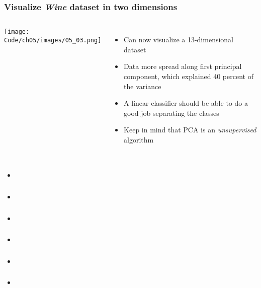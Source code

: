 \documentclass{beamer}
\begin{document}
\begin{frame}
  \frametitle{Visualize \textit{Wine} dataset in two dimensions}
  \begin{columns}[c]
    \texttt{[image: Code/ch05/images/05\_03.png]}
    \begin{itemize}
    \item Can now visualize a 13-dimensional dataset
    \item Data more spread along first principal component, which explained 40 percent of the variance
    \item A linear classifier should be able to do a good job separating the classes
    \item Keep in mind that PCA is an \textit{unsupervised} algorithm
    \end{itemize}
  \end{columns}
\end{frame}

\begin{frame}
  \frametitle{}
  \begin{itemize}
  \item 
  \end{itemize}
\end{frame}

\begin{frame}
  \frametitle{}
  \begin{itemize}
  \item 
  \end{itemize}
\end{frame}

\begin{frame}
  \frametitle{}
  \begin{itemize}
  \item 
  \end{itemize}
\end{frame}

\begin{frame}
  \frametitle{}
  \begin{itemize}
  \item 
  \end{itemize}
\end{frame}

\begin{frame}
  \frametitle{}
  \begin{itemize}
  \item 
  \end{itemize}
\end{frame}

\begin{frame}
  \frametitle{}
  \begin{itemize}
  \item 
  \end{itemize}
\end{frame}
\end{document}
